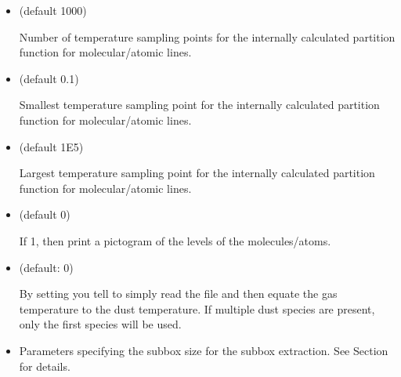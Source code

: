 \documentclass[letterpaper,10pt,english]{sphinxmanual}
\begin{document}
\begin{itemize}
If the doppler catching mode is used, this parameter tells how fine RADMC\sphinxhyphen{}3D
must sample along the ray, in units of the doppler width, when a line is
doppler\sphinxhyphen{}shifting along the wavelength\sphinxhyphen{}of\sphinxhyphen{}sight.

\item {} 
 (default 1000) 

Number of temperature sampling points for the internally calculated
partition function for molecular/atomic lines.

\item {} 
 (default 0.1) 

Smallest temperature sampling point for the internally calculated
partition function for molecular/atomic lines.

\item {} 
 (default 1E5) 

Largest temperature sampling point for the internally calculated
partition function for molecular/atomic lines.

\item {} 
 (default 0)

If 1, then print a pictogram of the levels of the molecules/atoms.

\item {} 
 (default: 0)

By setting  you tell  to
simply read the  file and then equate
the gas temperature to the dust temperature. If multiple dust species
are present, only the first species will be used.

\item {} 

Parameters specifying the subbox size for the subbox extraction.
See Section {\hyperref[\detokenize{toolsinside:sec-subbox}]{}} for details.

\end{itemize}
\end{document}
